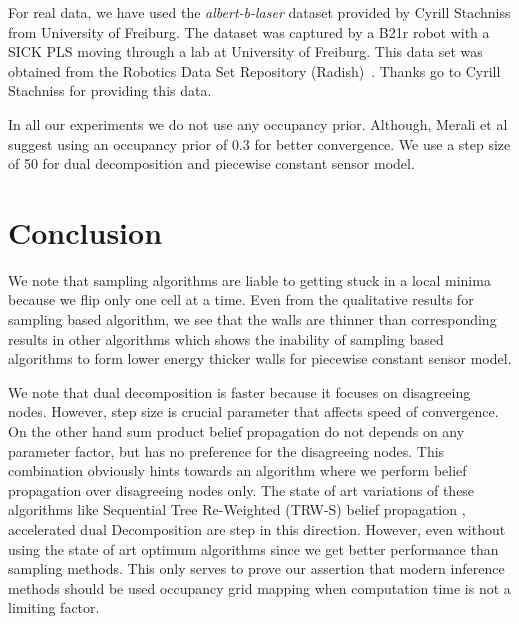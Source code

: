 \documentclass[letterpaper, 10 pt, conference]{ieeeconf} %
\begin{document}
For real data, we have used the \emph{albert-b-laser} dataset provided by
Cyrill Stachniss from University of Freiburg. The dataset was captured by a
B21r robot with a SICK PLS moving through a lab at University of Freiburg.
This data set was obtained from the Robotics Data Set Repository
(Radish)~\cite{howard2003radish}. Thanks go to Cyrill Stachniss for providing
this data.

In all our experiments we do not use any occupancy prior. Although, Merali et
al \cite{merali2013icra} suggest using an occupancy prior of 0.3 for better
convergence. We use a step size of 50 for dual decomposition and piecewise constant 
sensor model.

\section{Conclusion}
We note that sampling algorithms are liable to getting stuck in a local minima
because we flip only one cell at a time. Even from the qualitative results for
sampling based algorithm, we see that the walls are thinner than corresponding
results in other algorithms which shows the inability of sampling based
algorithms to form lower energy thicker walls for piecewise constant sensor
model.

We note that dual decomposition is faster because it focuses on disagreeing
nodes. However, step size is crucial parameter that affects speed of
convergence. On the other hand sum product belief propagation do not depends
on any parameter factor, but has no preference for the disagreeing nodes.
This combination obviously hints towards an algorithm where we perform 
belief propagation over disagreeing nodes only. The state of art variations 
of these algorithms like Sequential Tree Re-Weighted (TRW-S) belief
propagation \cite{kolmogorov2006convergent}, accelerated dual Decomposition
\cite{jojic2010accelerated} are step in this direction.
However, even without using the state of art optimum algorithms since we get
better performance than sampling methods. This only serves to prove our
assertion that modern inference methods should be used occupancy grid mapping 
when computation time is not a limiting factor.
\end{document}
